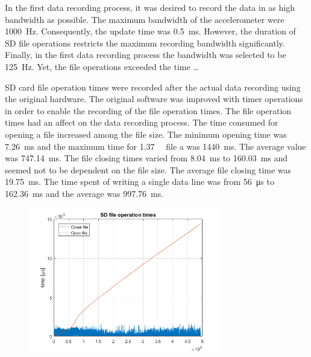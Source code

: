 \documentclass[english,12pt,a4paper,pdftex,elec,utf8]{aaltothesis}
\begin{document}
In the first data recording process, it was desired to record the data in as high bandwidth as possible. The maximum bandwidth of the accelerometer were \SI{1000}{\hertz}. Consequently, the update time was \SI{0.5}{\milli \second}. However, the duration of SD file operations restricts the maximum recording bandwidth significantly. Finally, in the first data recording process the bandwidth was selected to be \SI{125}{\hertz}. Yet, the file operations exceeded the time \dots

SD card file operation times were recorded after the actual data recording using the original hardware. The original software was improved with timer operations in order to enable the recording of the file operation times. The file operation times had an affect on the data recording process. The time consumed for opening a file increased among the file size. The minimum opening time was \SI{7.26}{\milli\second} and the maximum time for \SI{1.37}{\giga \byte} file a was \SI{1440}{\milli \second}. The average value was \SI{747.14}{\milli \second}. The file closing times varied from \SI{8.04}{\milli \second} to \SI{160.03}{\milli \second} and seemed not to be dependent on the file size. The average file closing time was \SI{19.75}{\milli \second}. The time spent of writing a single data line was from \SI{56}{\micro \second} to \SI{162.36}{\milli\second} and the average was \SI{997.76}{\milli\second}. 



\begin{figure}[h]
\centering
\includegraphics[width = 0.75\textwidth]{figures/openclosetimes_vanha.png}
\caption{} \label{openclosetimes_old}
\end{figure}
\end{document}
